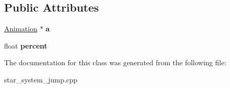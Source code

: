 \subsection*{Public Attributes}
\begin{DoxyCompactItemize}
\item 
\hyperlink{classAnimation}{Animation} $\ast$ {\bfseries a}\hypertarget{classResizeAni_ac06ce77a9e5167cbb109f8b67a72304b}{}\label{classResizeAni_ac06ce77a9e5167cbb109f8b67a72304b}

\item 
float {\bfseries percent}\hypertarget{classResizeAni_a5f4226fb6995280f5e61aeeaa28d7574}{}\label{classResizeAni_a5f4226fb6995280f5e61aeeaa28d7574}

\end{DoxyCompactItemize}


The documentation for this class was generated from the following file\+:\begin{DoxyCompactItemize}
\item 
star\+\_\+system\+\_\+jump.\+cpp\end{DoxyCompactItemize}
